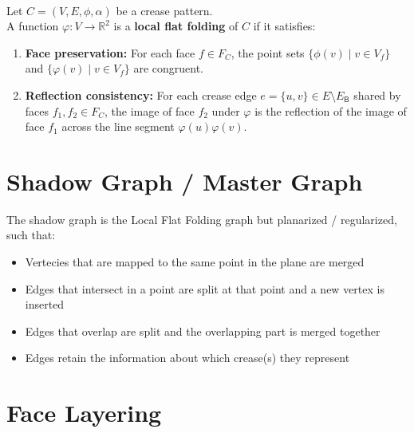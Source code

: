 \begin{definition}
~\\
Let $C = (V, E, \phi, \alpha)$ be a crease pattern.\\
A function $\varphi: V \to \mathbb{R}^2$ is a \textbf{local flat folding} of $C$ if it satisfies:

\begin{enumerate}
    \item \textbf{Face preservation:} For each face $f \in F_C$, the point sets $\{\phi(v) \mid v \in V_f\}$ and $\{\varphi(v) \mid v \in V_f\}$ are congruent.
    \item \textbf{Reflection consistency:} For each crease edge $e = \{u,v\} \in E \setminus E_{\mathsf{B}}$ shared by faces $f_1, f_2 \in F_C$, the image of face $f_2$ under $\varphi$ is the reflection of the image of face $f_1$ across the line segment $\varphi(u)\varphi(v)$.
\end{enumerate}
\end{definition}

\section{Shadow Graph / Master Graph}

The shadow graph is the Local Flat Folding graph but planarized / regularized, such that:

\begin{itemize}
    \item Vertecies that are mapped to the same point in the plane are merged
    \item Edges that intersect in a point are split at that point and a new vertex is inserted
    \item Edges that overlap are split and the overlapping part is merged together
    \item Edges retain the information about which crease(s) they represent
\end{itemize}

\section{Face Layering}

